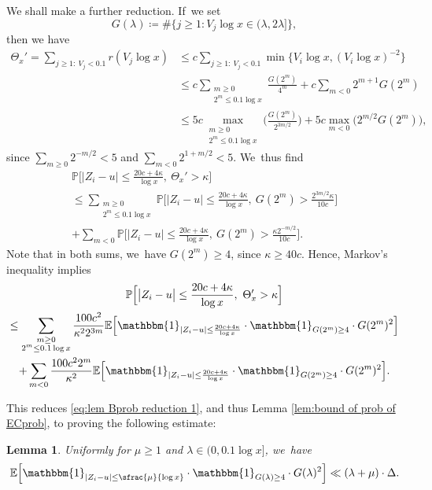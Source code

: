 \documentclass[JEP,XML,SOM,Unicode,published]{cedram}
\newcommand{\PP}{\mathbb{P}}
\newcommand{\EE}{\mathbb{E}}
\newcommand{\one}{\mathbbm{1}}
\newcommand{\bg}{\big}
\newcommand{\bgg}{\Big}
\theoremstyle{plain}
\newtheorem{lem}[cor]{Lemma}
\theoremstyle{definition}
\begin{document}
We shall make a further reduction. If~we set
\[
G(\lambda)\coloneqq \#\bg\{j\ge1: V_j\log x\in (\lambda,2\lambda] \bg\},
\]
then we have
\[
\begin{split}
\Theta_x' =\sum_{j\ge1:\ V_j<0.1} r(V_j\log x)
&\le c\sum_{j\ge1:\ V_j<0.1}\min\bg\{V_i\log x,(V_i\log x)^{-2}\bg\} \\
&\le c\sum_{\substack{m\ge0 \\ 2^m\le 0.1\log x}} \frac{G(2^m)}{4^m} + c \sum_{m<0} 2^{m+1} G(2^m) \\
&\le 5c \max_{\substack{m\ge0 \\ 2^m\le 0.1\log x}} \bgg(\frac{G(2^m)}{2^{3m/2}} \bgg) + 5c \max_{m<0}\bg(2^{m/2} G(2^m)\bg),
\end{split}
\]
since $\sum_{m\ge0}2^{-m/2} <5$ and $\sum_{m<0}2^{1+m/2}< 5$. We~thus find
\begin{multline*}
\PP\bgg[ \bg| Z_i - u \bg|\le \frac{20c+4\kappa}{\log x},\ \Theta_x'>\kappa \bgg] \\
\le \sum_{\substack{m\ge0 \\ 2^m\le 0.1\log x}} \!\!\! \PP\bgg[ \bg| Z_i - u \bg|\le \frac{20c+4\kappa}{\log x},\ G(2^m)> \frac{2^{3m/2} \kappa}{10c} \bgg] \\
+\sum_{m<0} \PP\bgg[ \bg| Z_i - u \bg|\le \frac{20c+4\kappa}{\log x},\ G(2^m)> \frac{\kappa 2^{-m/2}}{10c} \bgg].
\end{multline*}
Note that in both sums, we~have $G(2^m)\ge 4$, since $\kappa\ge 40c$. Hence, Markov's inequality implies
\begin{multline*}
\PP\bgg[ \bg| Z_i - u \bg|\le \frac{20c+4\kappa}{\log x},\ \Theta_x'>\kappa \bgg] \\
\le \sum_{\substack{m\ge0 \\ 2^m\le 0.1\log x}} \frac{100c^2}{\kappa^22^{3m}}
\EE\bgg[ \one_{| Z_i - u |\le \frac{20c+4\kappa}{\log x} } \cdot \one_{G(2^m) \ge4} \cdot G(2^m)^2\bgg] \\
+\sum_{m<0} \frac{100c^22^m}{\kappa^2}
\EE\bgg[ \one_{| Z_i - u |\le \frac{20c+4\kappa}{\log x} }\cdot \one_{G(2^m) \ge4}\cdot G(2^m)^2\bgg].
\end{multline*}

This reduces \eqref{eq:lem Bprob reduction 1}, and thus Lemma \ref{lem:bound of prob of ECprob}, to proving the following estimate:

\begin{lem}
\label{lem:Bprob reduction 2} Uniformly for $\mu\ge1$ and $\lambda\in(0,0.1\log x]$, we~have
\[
\EE\bgg[ \one_{| Z_i - u |\le \sfrac{\mu}{\log x} } \cdot \one_{G(\lambda) \ge4} \cdot G(\lambda)^2 \bgg]
\ll (\lambda+\mu)\cdot \Delta.
\]
\end{lem}
\end{document}
